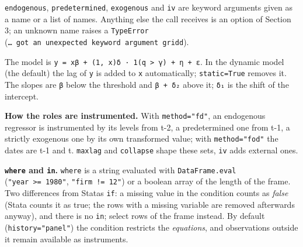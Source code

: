 \documentclass[
  10.5pt,
  a4paper,
]{article}
\begin{document}
\texttt{endogenous}, \texttt{predetermined}, \texttt{exogenous} and
\texttt{iv} are keyword arguments given as a name or a list of names.
Anything else the call receives is an option of Section 3; an unknown
name raises a \texttt{TypeError}
(\texttt{…\ got\ an\ unexpected\ keyword\ argument\ \textquotesingle{}gridd\textquotesingle{}}).

The model is
\texttt{y\ =\ x\textquotesingle{}β\ +\ (1,\ x\textquotesingle{})δ\ ·\ 1(q\ \textgreater{}\ γ)\ +\ η\ +\ ε}.
In the dynamic model (the default) the lag of \texttt{y} is added to
\texttt{x} automatically; \texttt{static=True} removes it. The slopes
are \texttt{β} below the threshold and \texttt{β\ +\ δ₂} above it;
\texttt{δ₁} is the shift of the intercept.

\textbf{How the roles are instrumented.} With \texttt{method="fd"}, an
endogenous regressor is instrumented by its levels from t-2, a
predetermined one from t-1, a strictly exogenous one by its own
transformed value; with \texttt{method="fod"} the dates are t-1 and t.
\texttt{maxlag} and \texttt{collapse} shape these sets, \texttt{iv} adds
external ones.

\textbf{\texttt{where} and \texttt{in}.} \texttt{where} is a string
evaluated with \texttt{DataFrame.eval}
(\texttt{"year\ \textgreater{}=\ 1980"}, \texttt{"firm\ !=\ 12"}) or a
boolean array of the length of the frame. Two differences from
Stata\textquotesingle s \texttt{if}: a missing value in the condition
counts as \emph{false} (Stata counts it as true; the rows with a missing
variable are removed afterwards anyway), and there is no \texttt{in};
select rows of the frame instead. By default (\texttt{history="panel"})
the condition restricts the \emph{equations}, and observations outside
it remain available as instruments.
\end{document}
